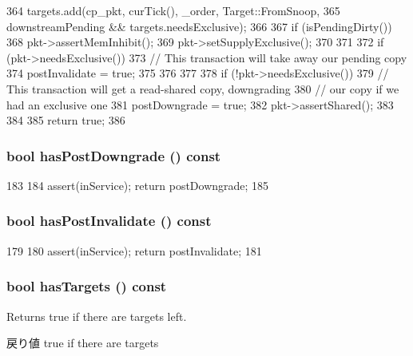 \begin{DoxyCode}
{{364         targets.add(cp_pkt, curTick(), _order, Target::FromSnoop,
365                      downstreamPending && targets.needsExclusive);
366 
367         if (isPendingDirty()) {
368             pkt->assertMemInhibit();
369             pkt->setSupplyExclusive();
370         }
371 
372         if (pkt->needsExclusive()) {
373             // This transaction will take away our pending copy
374             postInvalidate = true;
375         }
376     }
377 
378     if (!pkt->needsExclusive()) {
379         // This transaction will get a read-shared copy, downgrading
380         // our copy if we had an exclusive one
381         postDowngrade = true;
382         pkt->assertShared();
383     }
384 
385     return true;
386 }
\end{DoxyCode}
\hypertarget{classMSHR_a74c74cd6091f9e3e1523d3044ae9e9b4}{
\subsubsection[{hasPostDowngrade}]{\setlength{\rightskip}{0pt plus 5cm}bool hasPostDowngrade () const}}
\label{classMSHR_a74c74cd6091f9e3e1523d3044ae9e9b4}



\begin{DoxyCode}
183                                   {
184         assert(inService); return postDowngrade;
185     }
\end{DoxyCode}
\hypertarget{classMSHR_a492fb8bb0290ba36d8d05d9f86b8e754}{
\subsubsection[{hasPostInvalidate}]{\setlength{\rightskip}{0pt plus 5cm}bool hasPostInvalidate () const}}
\label{classMSHR_a492fb8bb0290ba36d8d05d9f86b8e754}



\begin{DoxyCode}
179                                    {
180         assert(inService); return postInvalidate;
181     }
\end{DoxyCode}
\hypertarget{classMSHR_a9b007d67bfb5a6ff382a6d78ec08b3af}{
\subsubsection[{hasTargets}]{\setlength{\rightskip}{0pt plus 5cm}bool hasTargets () const}}
\label{classMSHR_a9b007d67bfb5a6ff382a6d78ec08b3af}
Returns true if there are targets left. \begin{DoxyReturn}{戻り値}
true if there are targets 
\end{DoxyReturn}



